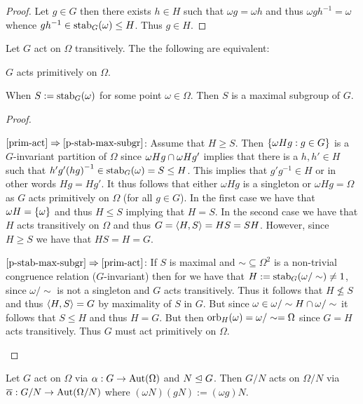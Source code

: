 \documentclass[8pt,a4paper]{article}
\begin{document}
\begin{proof}
    Let $g\in G$ then there exists $h\in H$ such that $\omega g=\omega h$ and thus $\omega gh^{-1}=\omega$ whence $gh^{-1}\in\stab[G](\omega)\leq H$. Thus $g\in H$.
\end{proof}
    

\begin{lemma}\label{or-stab-ff-trans} Let $G$ act on $\Omega$ transitively.
    The the following are equivalent:
    \begin{statements}
            \item\label{prim-act} $G$ acts primitively on $\Omega$.
            \item\label{p-stab-max-subgr} When $S:=\stab[G](\omega)$ for some point $\omega\in\Omega$. Then $S$ is a maximal subgroup of $G$.
    \end{statements}
\end{lemma}

\begin{proof}
    \begin{implications}
        \item[$\ref{prim-act}\implies\ref{p-stab-max-subgr}$:]
    Assume that $H\geq S$. Then $\set{\omega Hg:g\in G}$ is a $G$-invariant partition of $\Omega$ since $\omega Hg\setmeet \omega Hg'$ implies that there is a $h,h'\in H$ such that $h'g'{(hg)}^{-1}\in \stab[G](\omega)=S\leq H$. This implies that $g'g^{-1}\in H$ or in other words $Hg=Hg'$. It thus follows that either $\omega Hg$ is a singleton or $\omega Hg=\Omega$ as $G$ acts primitively on $\Omega$ (for all $g\in G$).
    In the first case we have that $\omega H=\set{\omega}$ and thus $H\leq S$ implying that $H=S$.
    In the second case we have that $H$ acts transitively on $\Omega$ and thus $G=\gen{H,S}=HS=SH$.
    However, since $H\geq S$ we have that $HS=H=G$.
        \item[$\ref{p-stab-max-subgr}\implies\ref{prim-act}$:]
    If $S$ is maximal and $\sim\subseteq \Omega^2$ is a non-trivial congruence relation ($G$-invariant) then for we have that $H:=\stab[G](\omega/\sim)\neq 1$, since $\omega/\sim$ is not a singleton and $G$ acts transitively. Thus it follows that $H\not\leq S$ and thus $\gen{H,S}=G$ by maximality of $S$ in $G$.
    But since $\omega\in\omega/\sim H\setmeet \omega/\sim$ it follows that $S\leq H$ and thus $H=G$. But then $\orb[H](\omega)=\omega/\sim = \Omega$ since $G=H$ acts transitively. Thus $G$ must act primitively on $\Omega$. 
\end{implications}
\end{proof}
%
\begin{lemma} Let $G$ act on $\Omega$ via $\alpha:G\to\Aut(\Omega)$ and $N\conleq G$. Then $G/N$ acts on $\Omega/N$ via $\bar{\alpha}:G/N\to\Aut(\Omega/N)$ where $(\omega N)(gN):=(\omega g)N$.
\end{lemma}
\end{document}

